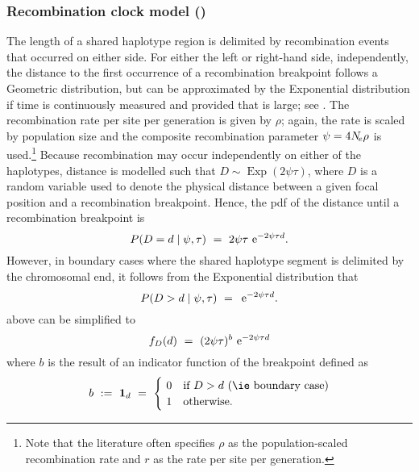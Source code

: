 %
\subsubsection{Recombination clock model (\ClockR)}\label{sec:rec_clock}
%


The length of a shared haplotype region is delimited by  recombination events that occurred on either side.
For either the left or right-hand side, independently, the distance to the first occurrence of a recombination breakpoint follows a Geometric distribution, but can be approximated by the Exponential distribution if time is continuously measured and provided that \Ne is large; \eg see \citet{hein2004gene}.
The recombination rate per site per generation is given by $\rho$; again, the rate is scaled by population size and the composite recombination parameter ${\psi = 4 N_{\!e} \rho}$ is used.\footnote{Note that the literature often specifies $\rho$ as the population-scaled recombination rate and $r$ as the rate per site per generation.}
Because recombination may occur independently on either of the  haplotypes, distance is modelled such that ${D\sim\operatorname{Exp}(2\psi\tau)}$, where $D$ is a random variable used to denote the physical distance between a given focal position and a recombination breakpoint.
Hence, the \gls{pdf} of the distance until a recombination breakpoint is
\begin{equation}\label{eq:rec_prob_brk}
	P(D=d\mid\psi,\tau)~=~2\psi\tau \,\,\mathrm{e}^{-2\psi\tau d}\text{.}
\end{equation}
However, in boundary cases where the shared haplotype segment is delimited by the chromosomal end, it follows from the Exponential distribution that
\begin{equation}\label{eq:rec_prob_nobrk}
	P(D>d\mid\psi,\tau)~=~\,\mathrm{e}^{-2\psi\tau d}\text{.}
\end{equation}
 above can be simplified to
\begin{equation}\label{eq:rec_prob}
	f_D(d)~=~(2\psi\tau)^b \,\,\mathrm{e}^{-2\psi\tau d}
\end{equation}
where $b$ is the result of an indicator function of the breakpoint defined as
\begin{equation*}
	b~:=~\mathbf{1}_d~=~
	\begin{cases}
    ~ 0 & \text{if}~D>d~\text{(\ie boundary case)} \\
    ~ 1 & \text{otherwise}\text{.}
  \end{cases}
\end{equation*}

